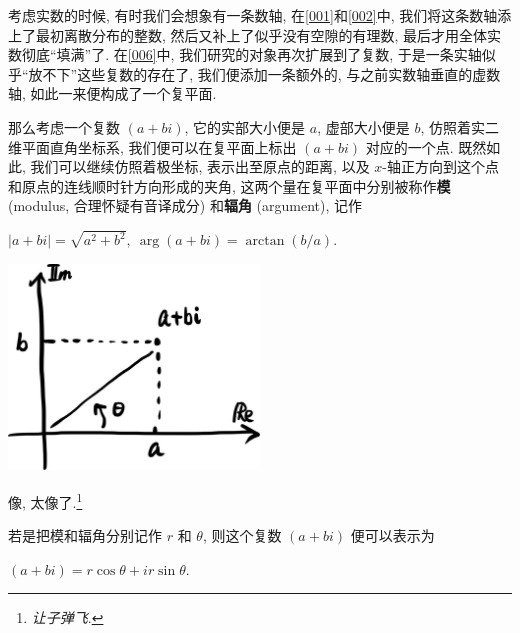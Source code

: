 \begin{tcolorbox}[size=fbox, breakable, enhanced jigsaw, title={复平面 (complex
plane)}]

考虑实数的时候, 有时我们会想象有一条数轴, 在\ref{001}和\ref{002}中,
我们将这条数轴添上了最初离散分布的整数,
然后又补上了似乎没有空隙的有理数, 最后才用全体实数彻底``填满''了.
在\ref{006}中, 我们研究的对象再次扩展到了复数,
于是一条实轴似乎``放不下''这些复数的存在了, 我们便添加一条额外的,
与之前实数轴垂直的虚数轴, 如此一来便构成了一个复平面.

那么考虑一个复数 $(a+bi)$, 它的实部大小便是 $a$, 虚部大小便是 $b$,
仿照着实二维平面直角坐标系, 我们便可以在复平面上标出 $(a+bi)$
对应的一个点. 既然如此, 我们可以继续仿照着极坐标, 表示出至原点的距离,
以及 $x$-轴正方向到这个点和原点的连线顺时针方向形成的夹角,
这两个量在复平面中分别被称作\textbf{模} (modulus, 合理怀疑有音译成分)
和\textbf{辐角} (argument), 记作

$ | a+bi|=\sqrt{a^2+b^2},~\arg(a+bi)=\arctan (b/a).$

\begin{tcolorbox}[size=fbox, breakable, enhanced jigsaw]
\includegraphics[width=0.5\textwidth]{img/image-20230418112740537.png}

\end{tcolorbox}

\begin{newquote}
像, 太像了.\footnote{\emph{让子弹飞}.}
\end{newquote}

若是把模和辐角分别记作 $r$ 和 $\theta$, 则这个复数 $(a+bi)$
便可以表示为

$(a+bi)=r\cos\theta+ir\sin\theta.$

\end{tcolorbox}

